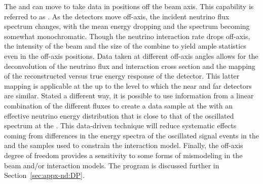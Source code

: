 The  and  can move to take data in positions off the beam axis.  This capability is referred to as . As the detectors move off-axis, the incident neutrino flux spectrum changes, with the mean energy dropping and the spectrum becoming somewhat monochromatic.  Though the neutrino interaction rate drops off-axis, the intensity of the beam and the size of the   combine to yield ample statistics even in the off-axis positions. 
Data taken at different off-axis angles allows for the deconvolution of the neutrino flux and interaction cross section and the mapping of the reconstructed versus true energy response of the detector.  This latter mapping is applicable at the  up to the level to which the near and far  detectors are similar.  Stated a different way, it is possible to use information from a linear combination of the different fluxes to create a data sample at the  with an effective neutrino energy distribution that is close to that of the oscillated spectrum at the .  This data-driven technique will reduce systematic effects coming from differences in the energy spectra of the oscillated signal events in the  and the  samples used to constrain the interaction model. Finally, the off-axis degree of freedom provides a sensitivity to some forms of mismodeling in the beam and/or interaction models. The  program is discussed further in Section~\ref{sec:appx-nd:DP}.

